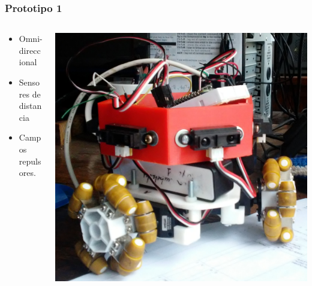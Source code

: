 \documentclass[spanish]{beamer}
\begin{document}
\begin{frame}
	\frametitle{Prototipo 1}
  \begin{columns}[T]
  	\begin{column}{.5\textwidth}
  		\vspace{1em}
		\begin{itemize}
			\item Omni-direccional
			\item Sensores de distancia
			\item Campos repulsores.
		\end{itemize}
  	\end{column}
  	\begin{column}{.5\textwidth}
		\begin{center}
			\includegraphics[width=\textwidth]{robotito.png}
		\end{center}
  	\end{column}
  \end{columns}
\end{frame}
\end{document}
